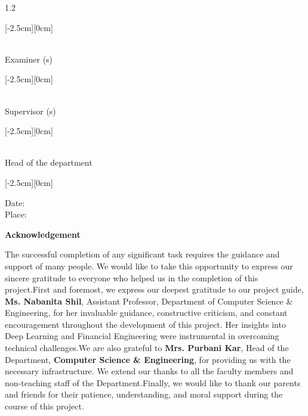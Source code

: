 \documentclass[12pt, a4paper]{report}
\begin{document}
\begin{spacing}{1.2}
\vspace*{1.2cm}
\begin{flushleft}
    \raisebox{1.0cm}[-2.5cm][0cm]{
        \begin{minipage}{7.5cm}
            \hrulefill\\
            Examiner (s)
        \end{minipage}
    }
\end{flushleft}

\vspace*{1.2cm}
\begin{flushleft}
    \raisebox{1.0cm}[-2.5cm][0cm]{
        \begin{minipage}{7.5cm}
            \hrulefill\\
            Supervisor (s)
        \end{minipage}
    }
\end{flushleft}

\vspace*{1.2cm}
\begin{flushleft}
    \raisebox{1.0cm}[-2.5cm][0cm]{
        \begin{minipage}{7.5cm}
            \hrulefill\\
            Head of the department 
        \end{minipage}
    }
\end{flushleft}

\vspace*{1.2cm}
\begin{flushleft}
    \raisebox{1.0cm}[-2.5cm][0cm]{
        \begin{minipage}{5cm}
            Date: \hrulefill\\
            Place: \hrulefill\\
        \end{minipage}
    }
\end{flushleft}
\newpage
\thispagestyle{plain} %
\baselineskip \centerline{\LARGE{\bf Acknowledgement}} \baselineskip
\noindent
The successful completion of any significant task requires the guidance and support of many people. We would like to take this opportunity to express our sincere gratitude to everyone who helped us in the completion of this project.First and foremost, we express our deepest gratitude to our project guide, \textbf{Ms. Nabanita Shil}, Assistant Professor, Department of Computer Science \& Engineering, for her invaluable guidance, constructive criticism, and constant encouragement throughout the development of this project. Her insights into Deep Learning and Financial Engineering were instrumental in overcoming technical challenges.We are also grateful to \textbf{Mrs. Purbani Kar}, Head of the Department, \textbf{Computer Science \& Engineering}, for providing us with the necessary infrastructure. We extend our thanks to all the faculty members and non-teaching staff of the Department.Finally, we would like to thank our parents and friends for their patience, understanding, and moral support during the course of this project.


\end{spacing}
\end{document}
